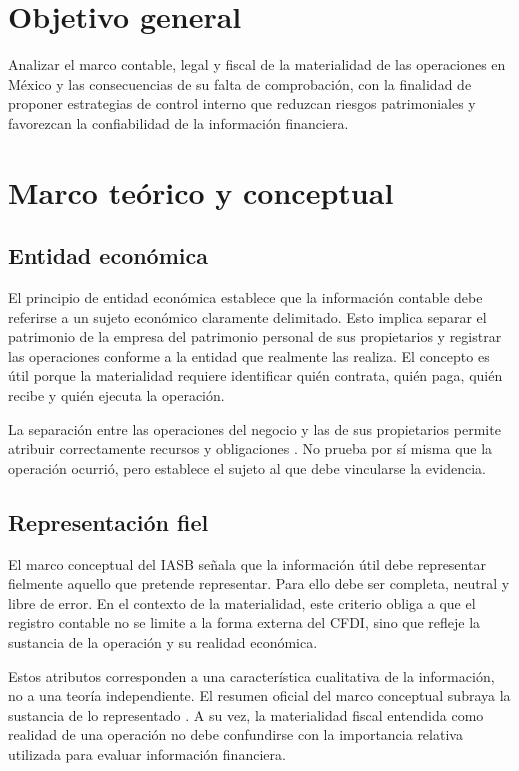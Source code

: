 \documentclass[spanish,12pt,letterpaper,oneside]{article}
\begin{document}
\section{Objetivo general}
Analizar el marco contable, legal y fiscal de la materialidad de las operaciones en México y las consecuencias de su falta de comprobación, con la finalidad de proponer estrategias de control interno que reduzcan riesgos patrimoniales y favorezcan la confiabilidad de la información financiera.

\section{Marco teórico y conceptual}
\subsection{Entidad económica}
El principio de entidad económica establece que la información contable debe referirse a un sujeto económico claramente delimitado. Esto implica separar el patrimonio de la empresa del patrimonio personal de sus propietarios y registrar las operaciones conforme a la entidad que realmente las realiza. El concepto es útil porque la materialidad requiere identificar quién contrata, quién paga, quién recibe y quién ejecuta la operación.

La separación entre las operaciones del negocio y las de sus propietarios permite atribuir correctamente recursos y obligaciones \parencite[cap. 3]{openstax2019}. No prueba por sí misma que la operación ocurrió, pero establece el sujeto al que debe vincularse la evidencia.

\subsection{Representación fiel}
El marco conceptual del IASB señala que la información útil debe representar fielmente aquello que pretende representar. Para ello debe ser completa, neutral y libre de error. En el contexto de la materialidad, este criterio obliga a que el registro contable no se limite a la forma externa del CFDI, sino que refleje la sustancia de la operación y su realidad económica.

Estos atributos corresponden a una característica cualitativa de la información, no a una teoría independiente. El resumen oficial del marco conceptual subraya la sustancia de lo representado \parencite[cap. 2]{ifrs2018}. A su vez, la materialidad fiscal entendida como realidad de una operación no debe confundirse con la importancia relativa utilizada para evaluar información financiera.
\end{document}
